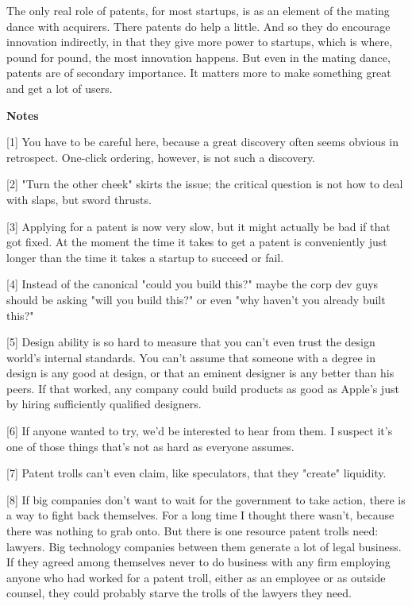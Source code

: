 The only real role of patents, for
                  most startups, is as an element of the mating dance with
                  acquirers. There patents do help a little. And so they do
                  encourage innovation indirectly, in that they give more power
                  to startups, which is where, pound for pound, the most
                  innovation happens. But even in the mating dance, patents are
                  of secondary importance. It matters more to make something
                  great and get a lot of users.



\textbf{Notes}

[1] You have to be careful here, because a great discovery
                  often seems obvious in retrospect. One-click ordering,
                  however, is not such a discovery.

[2] "Turn the other cheek" skirts the issue; the critical
                  question is not how to deal with slaps, but sword thrusts.

[3] Applying for a patent is now very slow, but it might
                  actually be bad if that got fixed. At the moment the time it
                  takes to get a patent is conveniently just longer than the
                  time it takes a startup to succeed or fail.

[4] Instead of the canonical "could you build this?" maybe the
                  corp dev guys should be asking "will you build this?" or even
                  "why haven't you already built this?"

[5] Design ability is so hard to measure that you can't even
                  trust the design world's internal standards. You can't assume
                  that someone with a degree in design is any good at design, or
                  that an eminent designer is any better than his peers. If that
                  worked, any company could build products as good as Apple's
                  just by hiring sufficiently qualified designers.

[6] If anyone wanted to try, we'd be interested to hear from
                  them. I suspect it's one of those things that's not as hard as
                  everyone assumes.

[7] Patent trolls can't even claim, like speculators, that they
                  "create" liquidity.

[8] If big companies don't want to wait for the government to
                  take action, there is a way to fight back themselves. For a
                  long time I thought there wasn't, because there was nothing to
                  grab onto. But there is one resource patent trolls need:
                  lawyers. Big technology companies between them generate a lot
                  of legal business. If they agreed among themselves never to do
                  business with any firm employing anyone who had worked for a
                  patent troll, either as an employee or as outside counsel,
                  they could probably starve the trolls of the lawyers they
                  need.

